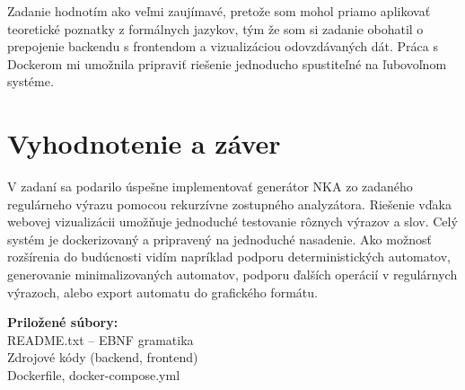 \documentclass[a4paper,12pt]{article}
\begin{document}
Zadanie hodnotím ako veľmi zaujímavé, pretože som mohol priamo aplikovať teoretické poznatky z formálnych jazykov, tým že som si zadanie obohatil o prepojenie backendu s frontendom a vizualizáciou odovzdávaných dát. Práca s Dockerom mi umožnila pripraviť riešenie jednoducho spustiteľné na ľubovoľnom systéme.


\section{Vyhodnotenie a záver}

V zadaní sa podarilo úspešne implementovať generátor NKA zo zadaného regulárneho výrazu pomocou rekurzívne zostupného analyzátora. Riešenie vďaka webovej vizualizácii umožňuje jednoduché testovanie rôznych výrazov a slov. Celý systém je dockerizovaný a pripravený na jednoduché nasadenie. Ako možnosť rozšírenia do budúcnosti vidím napríklad podporu deterministických automatov, generovanie minimalizovaných automatov, podporu ďalších operácií v regulárnych výrazoch, alebo export automatu do grafického formátu.

\vspace{1cm}
\noindent
\textbf{Priložené súbory:}\\
README.txt -- EBNF gramatika\\
Zdrojové kódy (backend, frontend)\\
Dockerfile, docker-compose.yml\\
\end{document}
